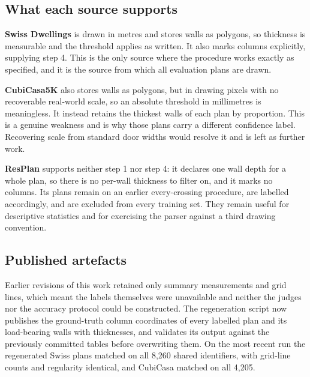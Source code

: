 \begin{table}[H]
\centering
\caption[Effect of the load-bearing threshold on the corpus]{Effect of the
load-bearing threshold on the corpus, Swiss Dwellings. Raising the
threshold admits fewer walls, so fewer plans yield a usable label and the
labels that survive are sparser.}
\label{tab:thresholdcorpus}
\small

\end{table}

\subsection{What each source supports}

\textbf{Swiss Dwellings} is drawn in metres and stores walls as polygons,
so thickness is measurable and the threshold applies as written. It also
marks columns explicitly, supplying step 4. This is the only source where
the procedure works exactly as specified, and it is the source from which
all evaluation plans are drawn.

\textbf{CubiCasa5K} also stores walls as polygons, but in drawing pixels
with no recoverable real-world scale, so an absolute threshold in
millimetres is meaningless. It instead retains the thickest walls of each
plan by proportion. This is a genuine weakness and is why those plans
carry a different confidence label. Recovering scale from standard door
widths would resolve it and is left as further work.

\textbf{ResPlan} supports neither step 1 nor step 4: it declares one wall
depth for a whole plan, so there is no per-wall thickness to filter on, and
it marks no columns. Its plans remain on an earlier every-crossing
procedure, are labelled accordingly, and are excluded from every training
set. They remain useful for descriptive statistics and for exercising the
parser against a third drawing convention.

\subsection{Published artefacts}

Earlier revisions of this work retained only summary measurements and grid
lines, which meant the labels themselves were unavailable and neither the
judges nor the accuracy protocol could be constructed. The regeneration
script now publishes the ground-truth column coordinates of every labelled
plan and its load-bearing walls with thicknesses, and validates its output
against the previously committed tables before overwriting them. On the
most recent run the regenerated Swiss plans matched on all 8,260 shared
identifiers, with grid-line counts and regularity identical, and CubiCasa
matched on all 4,205.

